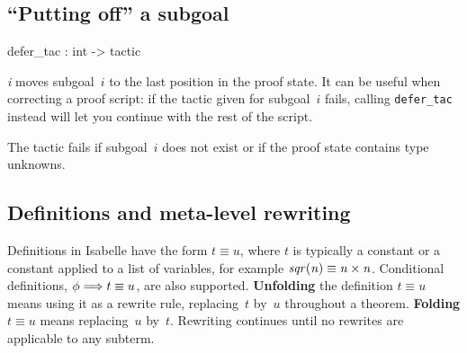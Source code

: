 \subsection{``Putting off'' a subgoal}
\begin{ttbox} 
defer_tac : int -> tactic
\end{ttbox}
\begin{ttdescription}
\item[\ttindexbold{defer_tac} {\it i}] 
  moves subgoal~$i$ to the last position in the proof state.  It can be
  useful when correcting a proof script: if the tactic given for subgoal~$i$
  fails, calling {\tt defer_tac} instead will let you continue with the rest
  of the script.

  The tactic fails if subgoal~$i$ does not exist or if the proof state
  contains type unknowns. 
\end{ttdescription}


\subsection{Definitions and meta-level rewriting} \label{sec:rewrite_goals}

Definitions in Isabelle have the form $t\equiv u$, where $t$ is typically a
constant or a constant applied to a list of variables, for example $\it
sqr(n)\equiv n\times n$.  Conditional definitions, $\phi\Longrightarrow t\equiv u$,
are also supported.  {\bf Unfolding} the definition ${t\equiv u}$ means using
it as a rewrite rule, replacing~$t$ by~$u$ throughout a theorem.  {\bf
Folding} $t\equiv u$ means replacing~$u$ by~$t$.  Rewriting continues until
no rewrites are applicable to any subterm.

